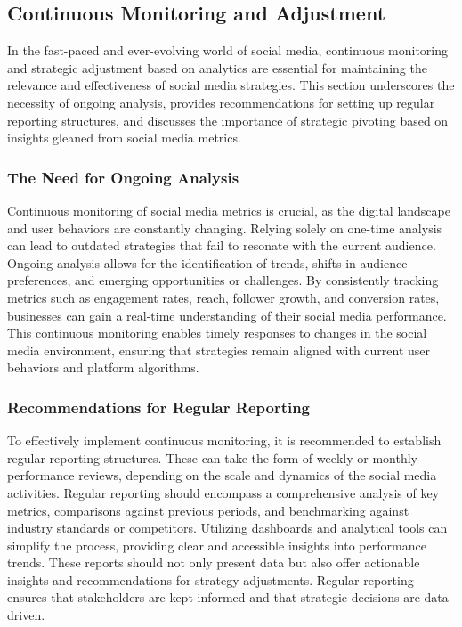 \documentclass[
]{book}
\begin{document}
\hypertarget{continuous-monitoring-and-adjustment}{%
\subsection*{Continuous Monitoring and Adjustment}\label{continuous-monitoring-and-adjustment}}

In the fast-paced and ever-evolving world of social media, continuous monitoring and strategic adjustment based on analytics are essential for maintaining the relevance and effectiveness of social media strategies. This section underscores the necessity of ongoing analysis, provides recommendations for setting up regular reporting structures, and discusses the importance of strategic pivoting based on insights gleaned from social media metrics.

\hypertarget{the-need-for-ongoing-analysis}{%
\subsubsection*{The Need for Ongoing Analysis}\label{the-need-for-ongoing-analysis}}

Continuous monitoring of social media metrics is crucial, as the digital landscape and user behaviors are constantly changing. Relying solely on one-time analysis can lead to outdated strategies that fail to resonate with the current audience. Ongoing analysis allows for the identification of trends, shifts in audience preferences, and emerging opportunities or challenges. By consistently tracking metrics such as engagement rates, reach, follower growth, and conversion rates, businesses can gain a real-time understanding of their social media performance. This continuous monitoring enables timely responses to changes in the social media environment, ensuring that strategies remain aligned with current user behaviors and platform algorithms.

\hypertarget{recommendations-for-regular-reporting}{%
\subsubsection*{Recommendations for Regular Reporting}\label{recommendations-for-regular-reporting}}

To effectively implement continuous monitoring, it is recommended to establish regular reporting structures. These can take the form of weekly or monthly performance reviews, depending on the scale and dynamics of the social media activities. Regular reporting should encompass a comprehensive analysis of key metrics, comparisons against previous periods, and benchmarking against industry standards or competitors. Utilizing dashboards and analytical tools can simplify the process, providing clear and accessible insights into performance trends. These reports should not only present data but also offer actionable insights and recommendations for strategy adjustments. Regular reporting ensures that stakeholders are kept informed and that strategic decisions are data-driven.
\end{document}
